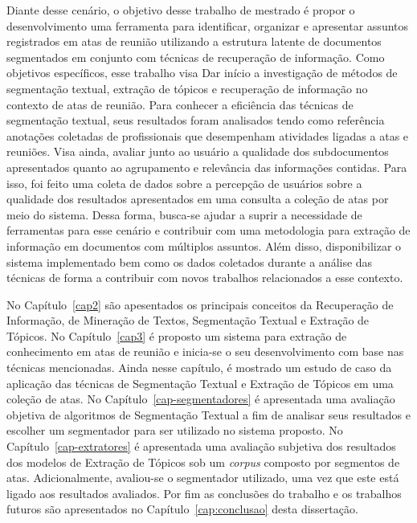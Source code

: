 
Diante desse cenário, o objetivo desse trabalho de mestrado é propor o desenvolvimento uma ferramenta para identificar, organizar e apresentar assuntos registrados em atas de reunião utilizando a estrutura latente de documentos segmentados em conjunto com técnicas de recuperação de informação. 
%
Como objetivos específicos, esse trabalho visa  
Dar início a investigação de métodos de segmentação textual, extração de tópicos e recuperação de informação no contexto de atas de reunião. Para conhecer a eficiência das técnicas de segmentação textual, seus resultados foram analisados tendo como referência anotações coletadas de profissionais que desempenham atividades ligadas a atas e reuniões.
Visa ainda, avaliar junto ao usuário a qualidade dos subdocumentos apresentados quanto ao agrupamento e relevância das informações contidas. Para isso, foi feito uma coleta de dados sobre a percepção de usuários sobre a qualidade dos resultados apresentados em uma consulta a coleção de atas por meio do sistema.
% 
Dessa forma, busca-se ajudar a suprir a necessidade de ferramentas para esse cenário e contribuir com uma metodologia para extração de informação em documentos com múltiplos assuntos. Além disso, disponibilizar o sistema implementado bem como os dados coletados durante a análise das técnicas de forma a contribuir com novos trabalhos relacionados a esse contexto.





No Capítulo~\ref{cap2} são apesentados os principais conceitos da Recuperação de Informação, de Mineração de Textos, Segmentação Textual e Extração de Tópicos.
%
No Capítulo~\ref{cap3} é proposto um sistema para extração de conhecimento em atas de reunião e inicia-se o seu desenvolvimento com base nas técnicas mencionadas. 
Ainda nesse capítulo, é mostrado um estudo de caso da aplicação das técnicas de Segmentação Textual e Extração de Tópicos em uma coleção de atas. 
%
No Capítulo~\ref{cap-segmentadores} é apresentada uma avaliação objetiva de algoritmos de Segmentação Textual a fim de analisar seus resultados e escolher um segmentador para ser utilizado no sistema proposto.
%
No Capítulo~\ref{cap-extratores} é apresentada uma avaliação subjetiva dos resultados dos modelos de Extração de Tópicos sob um \textit{corpus} composto por segmentos de atas. Adicionalmente, avaliou-se o segmentador utilizado, uma vez que este está ligado aos resultados avaliados. 
%
Por fim as conclusões do trabalho e os trabalhos futuros são apresentados no Capítulo~\ref{cap:conclusao} desta dissertação.





